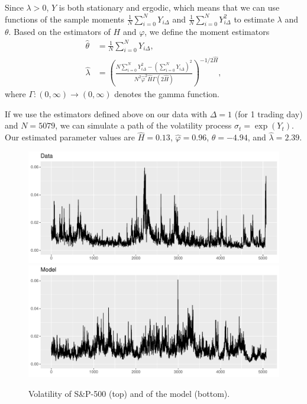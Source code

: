 Since $\lambda>0$, $Y$ is both stationary and ergodic, which means that we can use functions of the sample moments $\frac{1}{N}\sum_{i=0}^{N}Y_{i\Delta}$ and $\frac{1}{N}\sum_{i=0}^{N}Y_{i\Delta}^{2}$ to estimate $\lambda$ and $\theta$. Based on the estimators of $H$ and $\varphi$, we define the moment estimators
\begin{align}
    \hat{\theta} &= \frac{1}{N}\sum_{i=0}^{N}Y_{i\Delta},\\
    \hat{\lambda} &= \left(\frac{N\sum_{i=0}^{N}Y_{i\Delta}^{2}-\left(\sum_{i=0}^{N}Y_{i\Delta}\right)^{2}}{N^{2}\hat{\varphi}^{2}\hat{H}\Gamma(2\hat{H})}\right)^{-1/2\hat{H}},
\end{align}
where $\Gamma: (0,\infty)\to (0,\infty)$ denotes the gamma function.

If we use the estimators defined above on our data with $\Delta=1$ (for 1 trading day) and $N=5079$, we can simulate a path of the volatility process $\sigma_{t}=\exp(Y_{t})$. Our estimated parameter values are $\hat{H}=0.13$, $\hat{\varphi}=0.96$, $\hat{\theta} = -4.94$, and $\hat{\lambda} = 2.39$.
\begin{figure}[H]
    \centering
    \includegraphics[scale=0.65]{fig/img/RealizedLib/RealizedVolWithoutDates.pdf}
    \includegraphics[scale=0.65]{fig/img/RealizedLib/SimulatedVol.pdf}
    \caption{Volatility of S\&P-500 (top) and of the model (bottom).}
    \label{fig:datavol_modelvol}
\end{figure}

